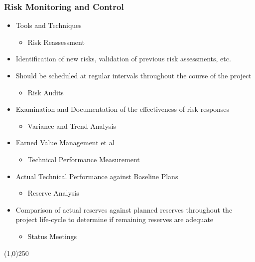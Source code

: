 \begin{frame}
\frametitle{Risk Monitoring and Control}
\begin{itemize}
\item Tools and Techniques
\begin{itemize}
	\item Risk Reassessment
\end{itemize}
\item Identification of new risks, validation of previous risk assessments, etc.
\item Should be scheduled at regular intervals throughout the course of the project
\begin{itemize}
	\item Risk Audits
\end{itemize}
\item Examination and Documentation of the effectiveness of risk responses
\begin{itemize}
	\item Variance and Trend Analysis
\end{itemize}
\item Earned Value Management et al
\begin{itemize}
	\item Technical Performance Measurement
\end{itemize}
\item Actual Technical Performance against Baseline Plans
\begin{itemize}
	\item Reserve Analysis
\end{itemize}
\item Comparison of actual reserves against planned reserves throughout the project life-cycle to determine if remaining reserves are adequate  
\begin{itemize}
	\item Status Meetings
\end{itemize}
\end{itemize}
\end{frame}\begin{center}\line(1,0){250}\end{center}


